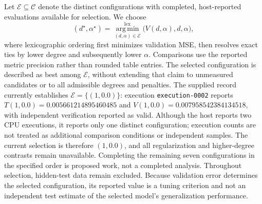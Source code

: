 \documentclass[11pt]{article}
\begin{document}
Let \(\mathcal{E}\subseteq\mathcal{C}\) denote the distinct configurations with completed, host-reported evaluations available for selection. We choose
\[
(d^\star,\alpha^\star)
=
\operatorname*{arg\,min}_{(d,\alpha)\in\mathcal{E}}^{\mathrm{lex}}
\bigl(V(d,\alpha),d,\alpha\bigr),
\]
where lexicographic ordering first minimizes validation MSE, then resolves exact ties by lower degree and subsequently lower \(\alpha\). Comparisons use the reported metric precision rather than rounded table entries. The selected configuration is described as best among \(\mathcal{E}\), without extending that claim to unmeasured candidates or to all admissible degrees and penalties. The supplied record currently establishes \(\mathcal{E}=\{(1,0.0)\}\): execution \texttt{execution-0002} reports \(T(1,0.0)=0.005661214895460485\) and \(V(1,0.0)=0.007958542384134518\), with independent verification reported as valid. Although the host reports two CPU executions, it reports only one distinct configuration; execution counts are not treated as additional comparison conditions or independent samples. The current selection is therefore \((1,0.0)\), and all regularization and higher-degree contrasts remain unavailable. Completing the remaining seven configurations in the specified order is proposed work, not a completed analysis. Throughout selection, hidden-test data remain excluded. Because validation error determines the selected configuration, its reported value is a tuning criterion and not an independent test estimate of the selected model's generalization performance.
\end{document}
